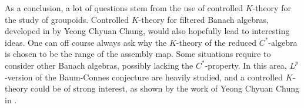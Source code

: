 
As a conclusion, a lot of questions stem from the use of controlled $K$-theory for the study of groupoids. Controlled $K$-theory for filtered Banach algebras, developed in \cite{Chung2} by Yeong Chyuan Chung, would also hopefully lead to interesting ideas. One can off course always ask why the $K$-theory of the reduced $C^*$-algebra is chosen to be the range of the assembly map. Some situations require to consider other Banach algebras, possibly lacking the $C^*$-property. In this area, $L^p$-version of the Baum-Connes conjecture are heavily studied, and a controlled $K$-theory could be of strong interest, as shown by the work of Yeong Chyuan Chung in \cite{Chung1}.\\



















 

      
